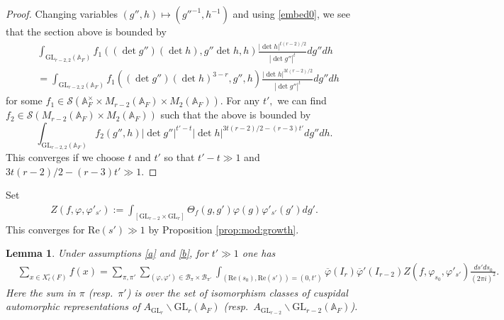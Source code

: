 \documentclass[12pt]{amsart}
\newtheorem{lem}[thm]{Lemma}
\theoremstyle{remark}
\numberwithin{equation}{section}
\newcommand{\A}{\mathbb{A}}
\newcommand{\GL}{\mathrm{GL}}
\theoremstyle{definition}
\numberwithin{equation}{subsection}
\begin{document}
\begin{proof}
Changing variables $(g'',h) \mapsto (g''^{-1},h^{-1})$ and using \eqref{embed0}, we see that the section above is bounded by 
\begin{align*}
&\int_{\GL_{r-2,2}(\A_F)} f_1\left( (\det g'')(\det h), g''\det h,h\right)\frac{|\det h|^{t(r-2)/2}}{|\det g''|^t}dg''dh\\
&=\int_{\GL_{r-2,2}(\A_F)} f_1\left( (\det g'')(\det h)^{3-r}, g'',h\right)\frac{|\det h|^{3t(r-2)/2}}{|\det g''|^t}dg''dh
\end{align*} 
for some $f_1\in \mathcal{S}(\A_F^\times \times M_{r-2}(\A_F) \times M_{2}(\A_F)).$ 
For any $t',$ we can find $f_2 \in \mathcal{S}(M_{r-2}(\A_F) \times M_{2}(\A_F))$ such that the above is bounded by 
$$
\int_{\GL_{r-2,2}(\A_F)} f_2\left( g'',h\right)|\det g''|^{t'-t}|\det h|^{3t(r-2)/2-(r-3)t'}dg''dh.
$$
This converges if we choose $t$ and $t'$ so that $t'-t \gg 1$ and $3t(r-2)/2-(r-3)t' \gg 1.$ 
\end{proof}

Set 
\begin{align}
    Z(f,\varphi,\varphi'_{s'}):=\int_{[\GL_{r-2} \times \GL_r]} \Theta_f(g,g')\varphi(g)\varphi'_{s'}(g')dg'.
\end{align}
This converges for $\mathrm{Re}(s') \gg 1$ by Proposition \ref{prop:mod:growth}.  

\begin{lem} \label{sumexpansion}
Under assumptions \eqref{a} and \eqref{b}, for $t' \gg 1$  one has
\begin{align*}
    &\sum_{x \in X^\circ_{\ell}(F)}f\left(x\right)=\sum_{\pi,\pi'}\sum_{(\varphi,\varphi') \in \mathcal{B}_{\pi} \times \mathcal{B}_{\pi'}}\int_{(\mathrm{Re}(s_0),\mathrm{Re}(s'))=(0,t')}\overline{\varphi}(I_r)\overline{\varphi}'(I_{r-2})Z(f,\varphi_{s_0},\varphi'_{s'})\frac{ds'ds_0}{(2\pi i)^2}.
\end{align*}
Here the sum in $\pi$ (resp.~$\pi'$) is over the set of isomorphism classes of cuspidal automorphic representations of $A_{\GL_r} \backslash \GL_r(\A_F)$ (resp.~$A_{\GL_{r-2}} \backslash \GL_{r-2}(\A_F)$).
\end{lem}
\end{document}
